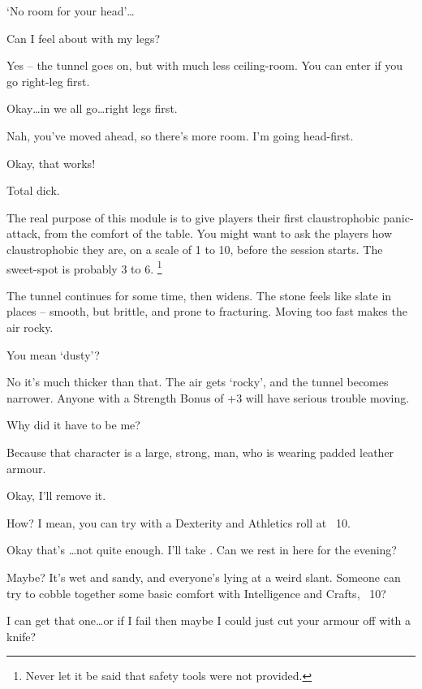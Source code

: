 \begin{multicols}{2}
\begin{description}
  `No room for your head'\ldots
  \item[Player 3:]
  Can I feel about with my legs?
  \item[\Glsentrytext{gm}:]
  Yes -- the tunnel goes on, but with much less ceiling-room.
  You can enter if you go right-leg first.
  \item[Player 3:]
  Okay\ldots in we all go\ldots right legs first.
  \item[Player 2:]
  Nah, you've moved ahead, so there's more room.
  I'm going head-first.
  \item[\Glsentrytext{gm}:]
  Okay, that works!
  \item[Player 3:]
  Total dick.
\end{description}

\bigLine
\vspace{2em}
\noindent
The real purpose of this module is to give players their first claustrophobic panic-attack, from the comfort of the table.
You might want to ask the players how claustrophobic they are, on a scale of 1 to 10, before the session starts.
The sweet-spot is probably 3 to 6.%
\footnote{Never let it be said that safety tools were not provided.}

\bigLine

\begin{description}\sf
  \item[\Glsentrytext{gm}:]
  The tunnel continues for some time, then widens.
  The stone feels like slate in places -- smooth, but brittle, and prone to fracturing.
  Moving too fast makes the air rocky.
  \item[Player 1:]
  You mean `dusty'?
  \item[\Glsentrytext{gm}:]
  No it's much thicker than that.
  The air gets `rocky', and the tunnel becomes narrower.
  Anyone with a Strength Bonus of +3 will have serious trouble moving.
  \item[Player 3:]
  Why did it have to be me?
  \item[\Glsentrytext{gm}:]
  Because that character is a large, strong, man, who is wearing padded leather armour.
  \item[Player 3:]
  Okay, I'll remove it.
  \item[\Glsentrytext{gm}:]
  How?
  I mean, you can try with a Dexterity and Athletics roll at ~10.
  \item[Player 3:]
  Okay that's \ldots not quite enough.
  I'll take .
  Can we rest in here for the evening?
  \item[\Glsentrytext{gm}:]
  Maybe?
  It's wet and sandy, and everyone's lying at a weird slant.
  Someone can try to cobble together some basic comfort with Intelligence and Crafts, ~10?
  \item[Player 1:]
  I can get that one\ldots or if I fail then maybe I could just cut your armour off with a knife?


\end{description}
\end{multicols}
